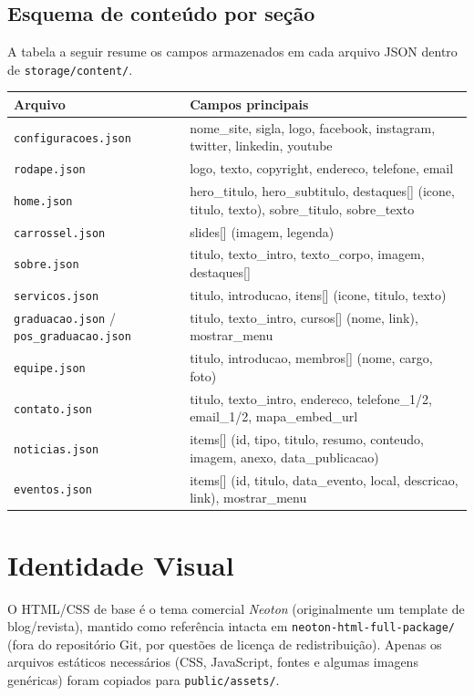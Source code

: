 \documentclass[11pt,a4paper]{article}
\begin{document}
\subsection{Esquema de conteúdo por seção}

A tabela a seguir resume os campos armazenados em cada arquivo JSON dentro de
\texttt{storage/content/}.

\begin{longtable}{@{}p{3.2cm}p{9.8cm}@{}}
\toprule
\textbf{Arquivo} & \textbf{Campos principais} \\
\midrule
\endhead
\texttt{configuracoes.json} & nome\_site, sigla, logo, facebook, instagram, twitter, linkedin, youtube \\
\texttt{rodape.json} & logo, texto, copyright, endereco, telefone, email \\
\texttt{home.json} & hero\_titulo, hero\_subtitulo, destaques[] (icone, titulo, texto), sobre\_titulo, sobre\_texto \\
\texttt{carrossel.json} & slides[] (imagem, legenda) \\
\texttt{sobre.json} & titulo, texto\_intro, texto\_corpo, imagem, destaques[] \\
\texttt{servicos.json} & titulo, introducao, itens[] (icone, titulo, texto) \\
\texttt{graduacao.json} / \texttt{pos\_graduacao.json} & titulo, texto\_intro, cursos[] (nome, link), mostrar\_menu \\
\texttt{equipe.json} & titulo, introducao, membros[] (nome, cargo, foto) \\
\texttt{contato.json} & titulo, texto\_intro, endereco, telefone\_1/2, email\_1/2, mapa\_embed\_url \\
\texttt{noticias.json} & items[] (id, tipo, titulo, resumo, conteudo, imagem, anexo, data\_publicacao) \\
\texttt{eventos.json} & items[] (id, titulo, data\_evento, local, descricao, link), mostrar\_menu \\
\bottomrule
\end{longtable}

\section{Identidade Visual}

O HTML/CSS de base é o tema comercial \emph{Neoton} (originalmente um template de blog/revista),
mantido como referência intacta em \texttt{neoton-html-full-package/} (fora do repositório
Git, por questões de licença de redistribuição). Apenas os arquivos estáticos necessários
(CSS, JavaScript, fontes e algumas imagens genéricas) foram copiados para
\texttt{public/assets/}.
\end{document}
